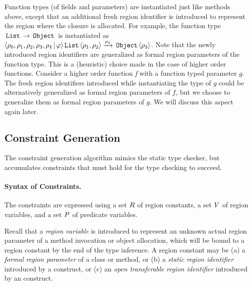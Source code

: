 Function types (of fields and parameters) are instantiated just like methods above, except that
an additional fresh region identifier is introduced to represent the region where the closure is
allocated.
For example, the function type $\,{\tt List}\, \rightarrow \,{\tt Object}\,$ is instantiated as
$\langle \rho_0, \rho_1, \rho_2, \rho_3, \rho_4 \,|\, \varphi  \rangle \,{\tt List}\, \langle \rho_1,\rho_2 \rangle \xrightarrow{\rho_4} \,{\tt Object}\,\langle \rho_3 \rangle$.
Note that the newly introduced region identifiers are generalized as formal region parameters of the function type.
This is a (heuristic) choice made in the case of higher order functions.
Consider a higher order function \emph{f} with a function typed parameter $g$.
The fresh region identifiers introduced while instantiating the type of $g$ could be
alternatively generalized as formal region parameters of $f$, but we choose to
generalize them as formal region parameters of $g$.
We will discuss this aspect again later.

\subsection{Constraint Generation}
\label{sec:fb-constraintsem}

The constraint generation algorithm mimics the static type checker, but accumulates
constraints that must hold for the type checking to succeed.

\paragraph{Syntax of Constraints.}
The constraints are expressed using
a set $R$ of region constants,
a set $V$ of region variables,
and
a set $P$ of predicate variables.
% 

Recall that a \emph{region variable} is introduced to represent an unknown actual region parameter
of a method invocation or object allocation, which will be bound to a region constant by the end of the
type inference.
A region constant may be 
(a) a \emph{formal region parameter} of a class or method, or
(b) a \emph{static region identifier} introduced by a  construct, or
(c) an  \emph{open transferable region identifier} introduced by an  construct.

